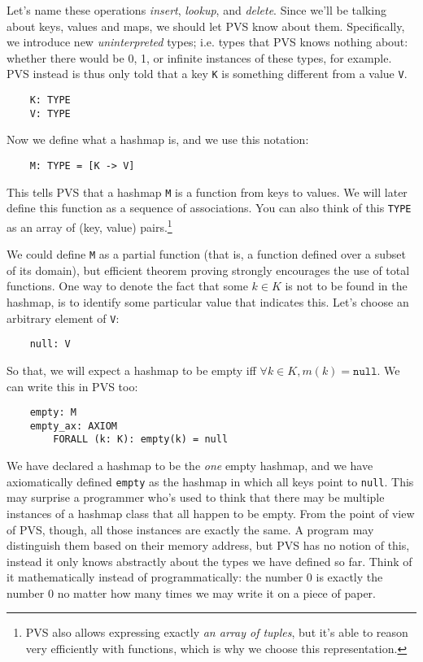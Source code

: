 Let's name these operations \emph{insert}, \emph{lookup}, and \emph{delete}.
Since we'll be talking about keys, values and maps, we should let PVS know about them.
Specifically, we introduce new \emph{uninterpreted} types; i.e. types that PVS knows nothing about: whether there would be 0, 1, or infinite instances of these types, for example.
PVS instead is thus only told that a key \texttt{K} is something different from a value \texttt{V}.

\begin{verbatim}
	K: TYPE
	V: TYPE
\end{verbatim}

Now we define what a hashmap is, and we use this notation:

\begin{verbatim}
	M: TYPE = [K -> V]
\end{verbatim}

This tells PVS that a hashmap \texttt{M} is a function from keys to values.
We will later define this function as a sequence of associations.
You can also think of this \texttt{TYPE} as an array of (key, value) pairs.\footnote{%
	PVS also allows expressing exactly \emph{an array of tuples}, but it's able to reason very efficiently with functions, which is why we choose this representation.
}

We could define \texttt{M} as a partial function (that is, a function defined over a subset of its domain), but efficient theorem proving strongly encourages the use of total functions.
One way to denote the fact that some $k \in K$ is not to be found in the hashmap, is to identify some particular value that indicates this.
Let's choose an arbitrary element of \texttt{V}:

\begin{verbatim}
	null: V
\end{verbatim}

So that, we will expect a hashmap to be empty iff $\forall k \in K, m(k) = \texttt{null}$.
We can write this in PVS too:

\begin{verbatim}
	empty: M
	empty_ax: AXIOM
	    FORALL (k: K): empty(k) = null
\end{verbatim}

We have declared a hashmap to be the \emph{one} empty hashmap, and we have axiomatically defined \texttt{empty} as the hashmap in which all keys point to \texttt{null}.
This may surprise a programmer who's used to think that there may be multiple instances of a hashmap class that all happen to be empty.
From the point of view of PVS, though, all those instances are exactly the same.
A program may distinguish them based on their memory address, but PVS has no notion of this, instead it only knows abstractly about the types we have defined so far.
Think of it mathematically instead of programmatically: the number 0 is exactly the number 0 no matter how many times we may write it on a piece of paper.

